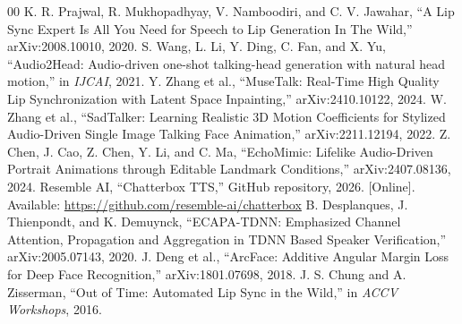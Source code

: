 \documentclass[10pt,conference]{IEEEtran}
\begin{document}
\begin{thebibliography}{00}
\scriptsize
{} K. R. Prajwal, R. Mukhopadhyay, V. Namboodiri, and C. V. Jawahar, ``A Lip Sync Expert Is All You Need for Speech to Lip Generation In The Wild,'' arXiv:2008.10010, 2020.
 S. Wang, L. Li, Y. Ding, C. Fan, and X. Yu, ``Audio2Head: Audio-driven one-shot talking-head generation with natural head motion,'' in \emph{IJCAI}, 2021.
 Y. Zhang et al., ``MuseTalk: Real-Time High Quality Lip Synchronization with Latent Space Inpainting,'' arXiv:2410.10122, 2024.
 W. Zhang et al., ``SadTalker: Learning Realistic 3D Motion Coefficients for Stylized Audio-Driven Single Image Talking Face Animation,'' arXiv:2211.12194, 2022.
 Z. Chen, J. Cao, Z. Chen, Y. Li, and C. Ma, ``EchoMimic: Lifelike Audio-Driven Portrait Animations through Editable Landmark Conditions,'' arXiv:2407.08136, 2024.
 Resemble AI, ``Chatterbox TTS,'' GitHub repository, 2026. [Online]. Available: \url{https://github.com/resemble-ai/chatterbox}
 B. Desplanques, J. Thienpondt, and K. Demuynck, ``ECAPA-TDNN: Emphasized Channel Attention, Propagation and Aggregation in TDNN Based Speaker Verification,'' arXiv:2005.07143, 2020.
 J. Deng et al., ``ArcFace: Additive Angular Margin Loss for Deep Face Recognition,'' arXiv:1801.07698, 2018.
 J. S. Chung and A. Zisserman, ``Out of Time: Automated Lip Sync in the Wild,'' in \emph{ACCV Workshops}, 2016.
\end{thebibliography}
\end{document}
